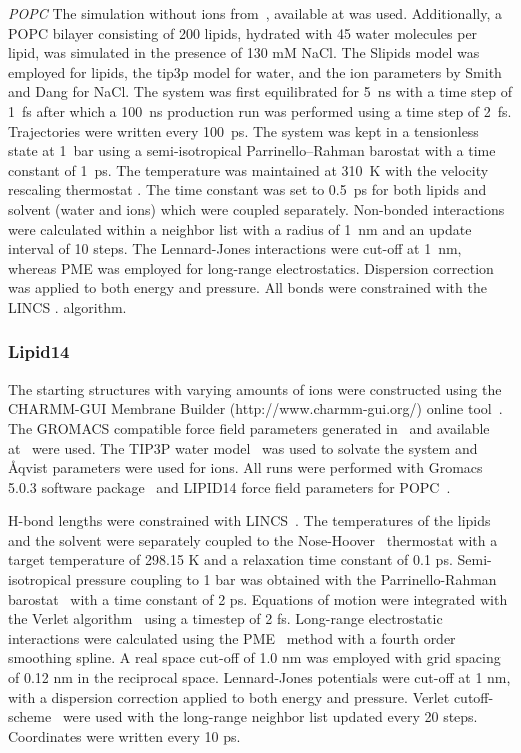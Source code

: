\documentclass[pre,aps,floatfix,authordate1-4,twocolumn]{revtex4-1}
\begin{document}
{\it POPC} The simulation without ions from~\cite{botan15}, available at \cite{slipidsFILESpopc} was used. 
Additionally, a POPC bilayer consisting of 200 lipids, hydrated with 45 water molecules per lipid, 
was simulated in the presence of 130 mM NaCl. 
The Slipids model \cite{jambeck12,jambeck12b}
was employed for lipids, the tip3p model \cite{jorgensen83} for water, and the ion parameters by Smith 
and Dang \cite{smith94} for NaCl. The system was first
equilibrated for 5~ns with a time step of 1~fs after which a 100~ns production run was performed using
a time step of 2~fs. Trajectories were written every 100~ps. The system was kept in a tensionless state at 1~bar 
using a semi-isotropical Parrinello--Rahman barostat \cite{parrinello81} with a time constant of 1~ps. 
The temperature was maintained at 310~K
with the velocity rescaling thermostat \cite{bussi07}. The time constant was set to 0.5~ps for both lipids and 
solvent (water and ions) which were coupled separately. Non-bonded interactions were calculated
within a neighbor list with a radius of 1~nm and an update interval of 10 steps. The Lennard-Jones
interactions were cut-off at 1~nm, whereas PME \cite{darden93,essman95} was employed for long-range electrostatics. 
Dispersion correction was applied to both energy and pressure. All bonds were constrained with the LINCS \cite{hess97,hess07}.
algorithm. 

\subsubsection{Lipid14}
The starting structures with varying amounts of ions were constructed using the CHARMM-GUI Membrane Builder (http://www.charmm-gui.org/) 
online tool~\cite{lee15}. The GROMACS compatible force field parameters generated in~\cite{botan15} and 
available at~\cite{lipid14files} were used. 
The TIP3P water model~\cite{jorgensen83} was used to solvate the system and \r{A}qvist \cite{aqvist90} parameters were used for ions.
All runs were performed with Gromacs 5.0.3 software package~\cite{abraham15}
and LIPID14 force field parameters for POPC~\cite{dickson14}. 

H-bond lengths were constrained with LINCS~\cite{hess97,hess07}. The temperatures of the lipids and the solvent were separately coupled to the 
Nose-Hoover~\cite{nose84,hoover85} thermostat with a target temperature of 298.15 K and a relaxation time constant of 0.1 ps. Semi-isotropical pressure 
coupling to 1 bar was obtained with the Parrinello-Rahman barostat~\cite{parrinello81} with a time constant of 2 ps. Equations of motion were integrated 
with the Verlet algorithm~\cite{pall13} using a timestep of 2 fs. Long-range electrostatic interactions were calculated using the PME~\cite{darden93,essman95} method 
with a fourth order smoothing spline. A real space cut-off of 1.0 nm was employed with grid spacing of 0.12 nm in the reciprocal space. 
Lennard-Jones potentials were cut-off at 1 nm, with a dispersion correction applied to both energy and pressure. Verlet cutoff-scheme~\cite{pall13} 
were used with the long-range neighbor list updated every 20 steps. Coordinates were written every 10 ps.
\end{document}
